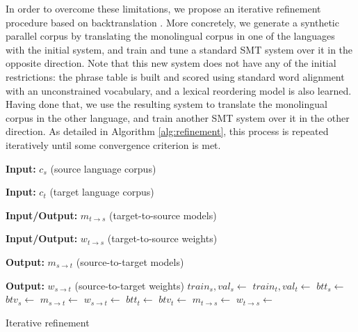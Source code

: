 \documentclass[11pt,a4paper]{article}
\begin{document}
In order to overcome these limitations, we propose an iterative refinement procedure based on backtranslation \citep{sennrich2016improving}. More concretely, we generate a synthetic parallel corpus by translating the monolingual corpus in one of the languages with the initial system, and train and tune a standard SMT system over it in the opposite direction. Note that this new system does not have any of the initial restrictions: the phrase table is built and scored using standard word alignment with an unconstrained vocabulary, and a lexical reordering model is also learned. Having done that, we use the resulting system to translate the monolingual corpus in the other language, and train another SMT system over it in the other direction. As detailed in Algorithm \ref{alg:refinement}, this process is repeated iteratively until some convergence criterion is met.

\begin{algorithm}[t]
\begin{algorithmic}[1]
\item[\textbf{Input:} $c_{s}$ (source language corpus)]
\item[\textbf{Input:} $c_{t}$ (target language corpus)]
\item[\textbf{Input/Output:} $m_{t \rightarrow s}$ (target-to-source models)]
\item[\textbf{Input/Output:} $w_{t \rightarrow s}$ (target-to-source weights)]
\item[\textbf{Output:} $m_{s \rightarrow t}$ (source-to-target models)]
\item[\textbf{Output:} $w_{s \rightarrow t}$ (source-to-target weights)]
\State $train_{s}, val_{s} \gets$ 
\State $train_{t}, val_{t} \gets$ 
\Repeat
  \State $btt_s \gets$ 
  \State $btv_s \gets$ 
  \State $m_{s \rightarrow t} \gets$ 
  \State $w_{s \rightarrow t} \gets$ 
  \State $btt_t \gets$ 
  \State $btv_t \gets$ 
  \State $m_{t \rightarrow s} \gets$ 
  \State $w_{t \rightarrow s} \gets$ 
\end{algorithmic}
\caption{Iterative refinement}
\label{alg:refinement}
\end{algorithm}
\end{document}
